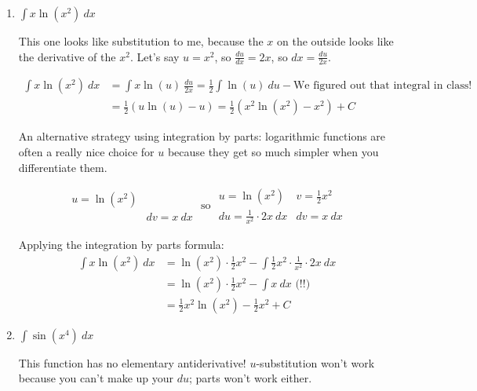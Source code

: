 \begin{enumerate}[leftmargin=0pt]
\begin{enumerate}
    \item $\int x\ln(x^2)\ dx$
    
    \begin{red}
    This one looks like substitution to me, because the $x$ on the outside looks like the derivative of the $x^2$. Let's say $u = x^2$, so $\frac{du}{dx} = 2x$, so $dx = \frac{du}{2x}$.
    
    \begin{align*}
        \int x\ln(x^2)\ dx &= \int x \ln(u)\ \frac{du}{2x} = \frac12 \int\ln(u)\ du - \textrm{We figured out that integral in class!}\\
        &= \frac12\left(u\ln(u) - u\right) = \frac12\left(x^2 \ln(x^2) - x^2\right) + C
    \end{align*}
    \end{red}
    
    \begin{blue}
    An alternative strategy using integration by parts: logarithmic functions are often a really nice choice for $u$ because they get so much simpler when you differentiate them.
    
    \[\begin{array}{ll}
        u = \ln(x^2) &  \\
         & dv = x\ dx
    \end{array}
    \textrm{ so }
    \begin{array}{ll}
        u = \ln(x^2) & v = \tfrac12 x^2 \\
        du = \frac{1}{x^2}\cdot 2x\ dx & dv = x\ dx 
    \end{array}
    \]
    
    Applying the integration by parts formula:
    \begin{align*}
        \int x\ln(x^2)\ dx &= \ln(x^2) \cdot \tfrac12 x^2 - 
        \int \frac12 x^2 \cdot \frac{1}{x^2} \cdot 2x\ dx \\
        &= \ln(x^2) \cdot \tfrac12 x^2 - \int x\ dx \textrm{ (!!)} \\
        &= \frac12 x^2 \ln(x^2) - \frac12 x^2 + C
    \end{align*}
    \end{blue}
    
    \item $\int \sin(x^4)\ dx$
    
    \begin{red}
    This function has no elementary antiderivative! $u$-substitution won't work because you can't make up your $du$; parts won't work either.
    \end{red}
    

\end{enumerate}
\end{enumerate}
